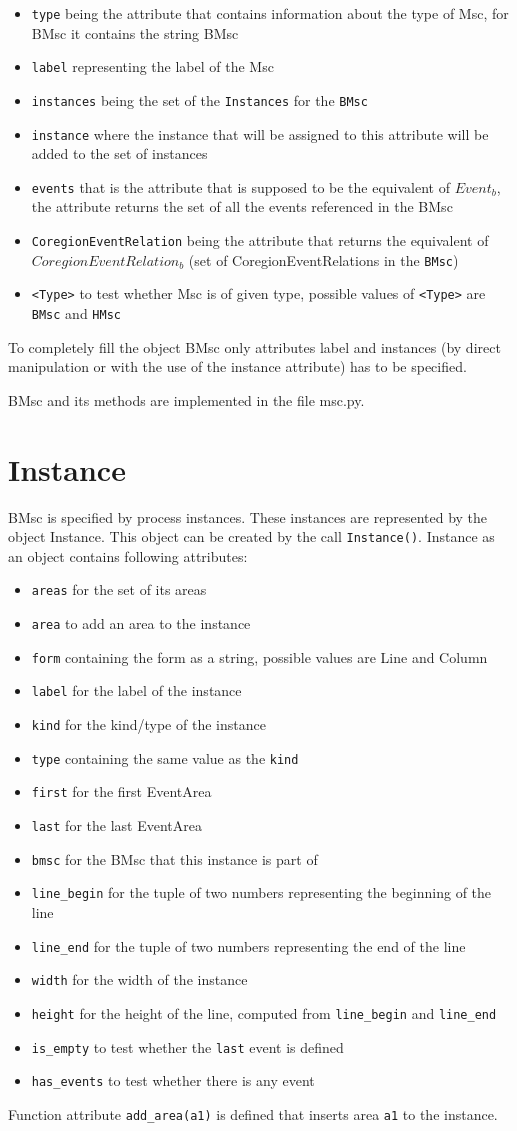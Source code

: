 \documentclass[11pt,oneside]{fithesis2}
\newcommand{\T}[1]{\texttt{#1}}
\newcommand{\ite}[1]{\item{\texttt{#1}}}
\begin{document}
\begin{itemize}
\ite{type} being the attribute that contains information about the type of Msc, for BMsc it contains the string BMsc
\ite{label} representing the label of the Msc
\ite{instances} being the set of the \T{Instances} for the \T{BMsc}
\ite{instance} where the instance that will be assigned to this attribute will be added to the set of instances
\ite{events} that is the attribute that is supposed to be the equivalent of $Event_b$, the attribute returns the set of all the events referenced in the BMsc
\ite{CoregionEventRelation} being the attribute that returns the equivalent of $CoregionEventRelation_b$ (set of CoregionEventRelations in the \T{BMsc})
\ite{<Type>} to test whether Msc is of given type, possible values of \T{<Type>} are \T{BMsc} and \T{HMsc}
\end{itemize}

To completely fill the object BMsc only attributes label and instances (by direct manipulation or with the use of the instance attribute) has to be specified.

BMsc and its methods are implemented in the file msc.py.


\section{Instance}
BMsc is specified by process instances. These instances are represented by the object Instance. This object can be created by the call \T{Instance()}. Instance as an object contains following attributes:
\begin{itemize}
\ite{areas} for the set of its areas
\ite{area} to add an area to the instance
\ite{form} containing the form as a string, possible values are Line and Column
\ite{label} for the label of the instance
\ite{kind} for the kind/type of the instance
\ite{type} containing the same value as the \T{kind}
\ite{first} for the first EventArea
\ite{last} for the last EventArea
\ite{bmsc} for the BMsc that this instance is part of
\ite{line\_begin} for the tuple of two numbers representing the beginning of the line
\ite{line\_end} for the tuple of two numbers representing the end of the line
\ite{width} for the width of the instance
\ite{height} for the height of the line, computed from \texttt{line\_begin} and \texttt{line\_end}
\ite{is\_empty} to test whether the \texttt{last} event is defined
\ite{has\_events} to test whether there is any event
\end{itemize}

Function attribute \texttt{add\_area(a1)} is defined that inserts area \texttt{a1} to the instance.
\end{document}

